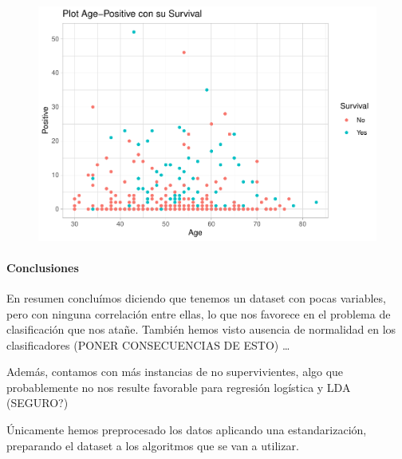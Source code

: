 \begin{figure}[H]\includegraphics[width=.9\linewidth]{img/EDA2_files/figure-latex/unnamed-chunk-37-1} \end{figure}

\paragraph{Conclusiones}

En resumen concluímos diciendo que tenemos un dataset con pocas variables, pero con ninguna correlación entre ellas, lo que nos favorece en el problema de clasificación que nos atañe. También hemos visto ausencia de normalidad en los clasificadores (PONER CONSECUENCIAS DE
ESTO) \ldots{}

Además, contamos con más instancias de no supervivientes, algo que probablemente no nos resulte favorable para regresión logística y LDA (SEGURO?)

Únicamente hemos preprocesado los datos aplicando una estandarización, preparando el dataset a los algoritmos que se van a utilizar.